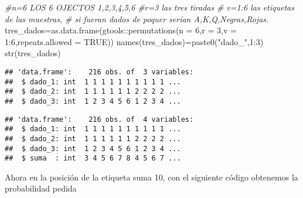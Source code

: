 \documentclass[
]{article}
\newenvironment{Shaded}{\begin{snugshade}}{\end{snugshade}}
\newcommand{\AttributeTok}[1]{\textcolor[rgb]{0.77,0.63,0.00}{#1}}
\newcommand{\CommentTok}[1]{\textcolor[rgb]{0.56,0.35,0.01}{\textit{#1}}}
\newcommand{\ConstantTok}[1]{\textcolor[rgb]{0.00,0.00,0.00}{#1}}
\newcommand{\DecValTok}[1]{\textcolor[rgb]{0.00,0.00,0.81}{#1}}
\newcommand{\FunctionTok}[1]{\textcolor[rgb]{0.00,0.00,0.00}{#1}}
\newcommand{\NormalTok}[1]{#1}
\newcommand{\OtherTok}[1]{\textcolor[rgb]{0.56,0.35,0.01}{#1}}
\newcommand{\SpecialCharTok}[1]{\textcolor[rgb]{0.00,0.00,0.00}{#1}}
\newcommand{\StringTok}[1]{\textcolor[rgb]{0.31,0.60,0.02}{#1}}
\begin{document}
\begin{Shaded}
\begin{Highlighting}[]
\CommentTok{\#n=6 LOS 6 OJECTOS 1,2,3,4,5,6}
\CommentTok{\#r=3 las tres tiradas}
\CommentTok{\# v=1:6 las etiquetas de las muestras,}
\CommentTok{\# si fueran dados  de poquer serían A,K,Q,Negras,Rojas.}
\NormalTok{tres\_dados}\OtherTok{=}\FunctionTok{as.data.frame}\NormalTok{(gtools}\SpecialCharTok{::}\FunctionTok{permutations}\NormalTok{(}\AttributeTok{n =} \DecValTok{6}\NormalTok{,}\AttributeTok{r =} \DecValTok{3}\NormalTok{,}\AttributeTok{v =} \DecValTok{1}\SpecialCharTok{:}\DecValTok{6}\NormalTok{,}\AttributeTok{repeats.allowed =} \ConstantTok{TRUE}\NormalTok{))}
\FunctionTok{names}\NormalTok{(tres\_dados)}\OtherTok{=}\FunctionTok{paste0}\NormalTok{(}\StringTok{"dado\_"}\NormalTok{,}\DecValTok{1}\SpecialCharTok{:}\DecValTok{3}\NormalTok{)}
\FunctionTok{str}\NormalTok{(tres\_dados)}
\end{Highlighting}
\end{Shaded}

\begin{verbatim}
## 'data.frame':    216 obs. of  3 variables:
##  $ dado_1: int  1 1 1 1 1 1 1 1 1 1 ...
##  $ dado_2: int  1 1 1 1 1 1 2 2 2 2 ...
##  $ dado_3: int  1 2 3 4 5 6 1 2 3 4 ...
\end{verbatim}

\begin{Shaded}
\end{Shaded}

\begin{verbatim}
## 'data.frame':    216 obs. of  4 variables:
##  $ dado_1: int  1 1 1 1 1 1 1 1 1 1 ...
##  $ dado_2: int  1 1 1 1 1 1 2 2 2 2 ...
##  $ dado_3: int  1 2 3 4 5 6 1 2 3 4 ...
##  $ suma  : int  3 4 5 6 7 8 4 5 6 7 ...
\end{verbatim}

Ahora en la posición de la etiqueta suma 10, con el siguiente código
obtenemos la probabilidad pedida

\begin{Shaded}
\end{Shaded}
\end{document}

